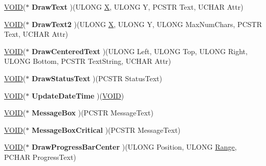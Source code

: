 \begin{DoxyCompactItemize}
\item 
\mbox{\label{structtag_u_i_v_t_b_l_a264d055d4d4e5a8156c9204a37f0d0ad}} 
\hyperlink{interfacevoid}{V\+O\+ID}($\ast$ {\bfseries Draw\+Text} )(U\+L\+O\+NG \hyperlink{class_x}{X}, U\+L\+O\+NG Y, P\+C\+S\+TR Text, U\+C\+H\+AR Attr)
\item 
\mbox{\label{structtag_u_i_v_t_b_l_ac842e7d7ddb3f239c1e1079e791b6521}} 
\hyperlink{interfacevoid}{V\+O\+ID}($\ast$ {\bfseries Draw\+Text2} )(U\+L\+O\+NG \hyperlink{class_x}{X}, U\+L\+O\+NG Y, U\+L\+O\+NG Max\+Num\+Chars, P\+C\+S\+TR Text, U\+C\+H\+AR Attr)
\item 
\mbox{\label{structtag_u_i_v_t_b_l_a6d1b7c339bdf4ecb8f85527f4af47b50}} 
\hyperlink{interfacevoid}{V\+O\+ID}($\ast$ {\bfseries Draw\+Centered\+Text} )(U\+L\+O\+NG Left, U\+L\+O\+NG Top, U\+L\+O\+NG Right, U\+L\+O\+NG Bottom, P\+C\+S\+TR Text\+String, U\+C\+H\+AR Attr)
\item 
\mbox{\label{structtag_u_i_v_t_b_l_a40ea971de4c773e8a0a288acf8d48df0}} 
\hyperlink{interfacevoid}{V\+O\+ID}($\ast$ {\bfseries Draw\+Status\+Text} )(P\+C\+S\+TR Status\+Text)
\item 
\mbox{\label{structtag_u_i_v_t_b_l_af2529dbce469be02afc6794b935e626b}} 
\hyperlink{interfacevoid}{V\+O\+ID}($\ast$ {\bfseries Update\+Date\+Time} )(\hyperlink{interfacevoid}{V\+O\+ID})
\item 
\mbox{\label{structtag_u_i_v_t_b_l_a9fc613e2b25e305e6ad7bfafadfb2751}} 
\hyperlink{interfacevoid}{V\+O\+ID}($\ast$ {\bfseries Message\+Box} )(P\+C\+S\+TR Message\+Text)
\item 
\mbox{\label{structtag_u_i_v_t_b_l_ac395d544c19295178eafeaad25bb1a88}} 
\hyperlink{interfacevoid}{V\+O\+ID}($\ast$ {\bfseries Message\+Box\+Critical} )(P\+C\+S\+TR Message\+Text)
\item 
\mbox{\label{structtag_u_i_v_t_b_l_abedba56bf4d703a8bc9e27019939258c}} 
\hyperlink{interfacevoid}{V\+O\+ID}($\ast$ {\bfseries Draw\+Progress\+Bar\+Center} )(U\+L\+O\+NG Position, U\+L\+O\+NG \hyperlink{structtag_range}{Range}, P\+C\+H\+AR Progress\+Text)

\end{DoxyCompactItemize}

